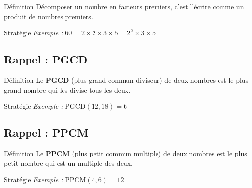 \begin{regle}{Définition}
Décomposer un nombre en facteurs premiers, c'est l'écrire comme un produit de nombres premiers.
\end{regle}

\vspace{6pt}
\begin{astuce}{Stratégie}
\textit{Exemple :} $60 = 2 \times 2 \times 3 \times 5 = 2^2 \times 3 \times 5$
\end{astuce}

\vspace{10pt}
\subsection{Rappel : PGCD}

\begin{regle}{Définition}
Le \textbf{PGCD} (plus grand commun diviseur) de deux nombres est le plus grand nombre qui les divise tous les deux.
\end{regle}

\vspace{6pt}
\begin{astuce}{Stratégie}
\textit{Exemple :} $\text{PGCD}(12, 18) = 6$
\end{astuce}

\vspace{10pt}
\subsection{Rappel : PPCM}

\begin{regle}{Définition}
Le \textbf{PPCM} (plus petit commun multiple) de deux nombres est le plus petit nombre qui est un multiple des deux.
\end{regle}

\vspace{6pt}
\begin{astuce}{Stratégie}
\textit{Exemple :} $\text{PPCM}(4, 6) = 12$
\end{astuce}